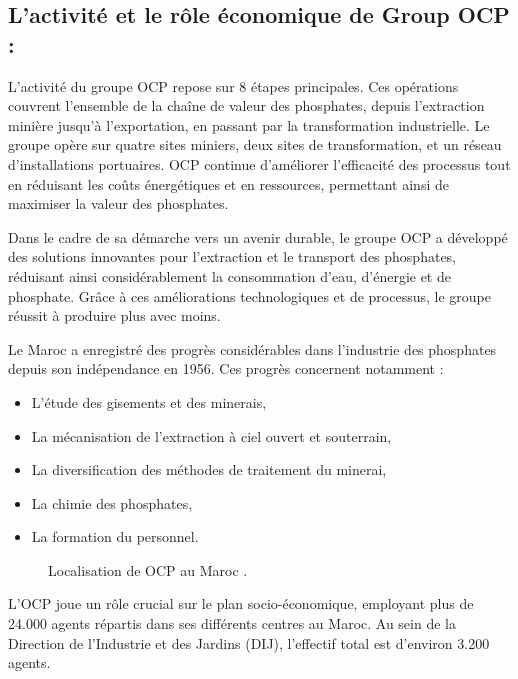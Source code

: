 \documentclass[a4paper,12pt]{report}
\begin{document}
\subsection{L'activité et le rôle économique de Group OCP :}
L'activité du groupe OCP repose sur 8 étapes principales. Ces opérations couvrent l'ensemble de la chaîne de valeur des phosphates, depuis l'extraction minière jusqu'à l'exportation, en passant par la transformation industrielle. Le groupe opère sur quatre sites miniers, deux sites de transformation, et un réseau d'installations portuaires. OCP continue d'améliorer l'efficacité des processus tout en réduisant les coûts énergétiques et en ressources, permettant ainsi de maximiser la valeur des phosphates.

Dans le cadre de sa démarche vers un avenir durable, le groupe OCP a développé des solutions innovantes pour l'extraction et le transport des phosphates, réduisant ainsi considérablement la consommation d'eau, d'énergie et de phosphate. Grâce à ces améliorations technologiques et de processus, le groupe réussit à produire plus avec moins.

Le Maroc a enregistré des progrès considérables dans l'industrie des phosphates depuis son indépendance en 1956. Ces progrès concernent notamment :

\begin{itemize}
  \item L'étude des gisements et des minerais,
  \item La mécanisation de l'extraction à ciel ouvert et souterrain,
  \item La diversification des méthodes de traitement du minerai,
  \item La chimie des phosphates,
  \item La formation du personnel.
\end{itemize}


\begin{figure}[h]
    \centering
    \caption{Localisation de OCP au Maroc .}
    \label{fig:mon_image}
\end{figure}

L'OCP joue un rôle crucial sur le plan socio-économique, employant plus de 24.000 agents répartis dans ses différents centres au Maroc. Au sein de la Direction de l'Industrie et des Jardins (DIJ), l'effectif total est d'environ 3.200 agents.
\end{document}
